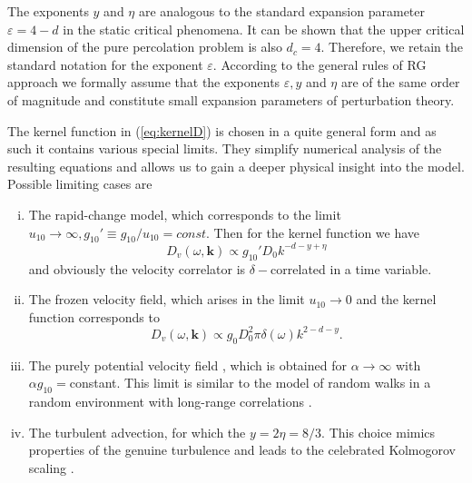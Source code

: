 \documentclass[aps,pre,url,twocolumn,superscriptaddress]{revtex4-1}
\def\eps{\varepsilon}
\def\mk{{\bm k}}
\begin{document}
The exponents $y$ and $\eta$ are analogous to the standard expansion parameter
$\eps = 4-d$ in the static critical phenomena.
It can be shown that the upper critical dimension of the pure
percolation problem \cite{JanTau04} is also $d_c = 4$.
Therefore, we retain the standard notation for the exponent $\eps$.
According to the general rules \cite{Vasiliev} of RG approach we formally assume
that  the exponents $\eps,y$ and $\eta$ are of the same order of magnitude and
 constitute small expansion parameters of perturbation theory.

%
%
%
The kernel function in (\ref{eq:kernelD}) is chosen in a quite
general form
 and as such it contains various special limits. 
 They simplify numerical analysis of the resulting equations and
 allows us to gain a deeper physical insight into the model.
 Possible limiting cases are
\begin{enumerate}[i)]
  \item The rapid-change model, which corresponds
	to the limit $u_{10} \rightarrow \infty, g_{10}' \equiv g_{10}/u_{10} = const$.
	Then for the kernel function we have
	\begin{equation}
	   D_v(\omega,{\mk}) \propto g_{10}' D_0 k^{-d-y+\eta}
	   \label{eq:rch_limit}
	\end{equation}
	 and obviously the velocity correlator is $\delta-$correlated in a time
	 variable.	
  \item The frozen velocity field, which arises in the limit $u_{10} \rightarrow 0$ 
	and the kernel function corresponds to 
	\begin{equation}
	   D_{v}(\omega,{\mk}) \propto g_0 D_0^2 \pi \delta(\omega) k^{2-d-y}.
	   \label{eq:fvf_limit}
	\end{equation}
  \item The purely potential velocity field , which is obtained for 
	$\alpha\rightarrow\infty$ with $\alpha g_{10}=$constant.
	This limit is similar to
	the model of random walks in a random environment with long-range
	correlations \cite{HonKar88,Bou90}.
  \item The turbulent advection, for which the $y=2\eta=8/3$. This choice mimics
	properties of the genuine turbulence and leads to the celebrated Kolmogorov
	scaling \cite{Frisch}.
\end{enumerate}
\end{document}
